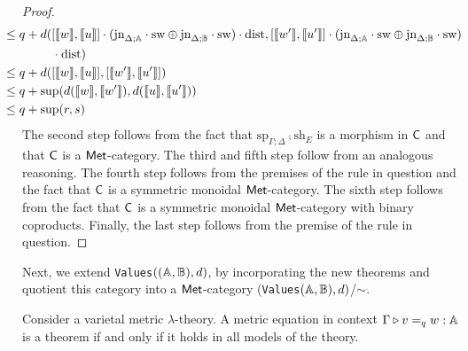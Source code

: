\begin{proof}
\begin{align*}
    & \hspace{-20pt} \leq  q +  d( [\llbracket w\rrbracket ,\llbracket u\rrbracket] \comp (\text{jn}_{\Delta;\typeA}\comp \sw \oplus \text{jn}_{\Delta;\typeB}\comp \sw) \comp \dist,  [\llbracket w'\rrbracket ,\llbracket u'\rrbracket] \comp (\text{jn}_{\Delta;\typeA}\comp \sw \oplus \text{jn}_{\Delta;\typeB}\comp \sw)  \\
    & \hspace{20pt} \comp \dist)\\
    &  \hspace{-20pt} \leq q +  d( [\llbracket w\rrbracket ,\llbracket u\rrbracket],  [\llbracket w'\rrbracket ,\llbracket u'\rrbracket]) \\
    & \hspace{-20pt}  \leq q + \sup(d( \llbracket w\rrbracket , \llbracket w' \rrbracket), d( \llbracket u\rrbracket , \llbracket u' \rrbracket)) \\
    & \hspace{-20pt} \leq  q + \sup(r, s) \\
  \end{align*}
  The second step follows from the fact that $\text{sp}_{\Gamma;\Delta} \comp \text{sh}_{E}$  is a morphism in $\mathsf{C}$  and that $\mathsf{C}$ is a $\mathsf{Met}$-category.  The third and fifth step follow from an analogous reasoning. The fourth step follows from the premises of the rule in question and the fact that $\mathsf{C}$ is a symmetric monoidal $\mathsf{Met}$-category. The sixth step follows from the fact that $\mathsf{C}$ is a symmetric monoidal $\mathsf{Met}$-category with binary coproducts. Finally, the last step follows from the premise of the rule in question.

\end{proof}

Next, we extend  \texttt{Values}$((\mathbb{A},\mathbb{B}),d)$, by incorporating the new theorems and quotient this category into a  $\mathsf{Met}$-category (\texttt{Values}$(\mathbb{A},\mathbb{B}),d)$/$\sim$.


\begin{theorem}[Completeness]
Consider a varietal metric $\lambda$-theory. A metric equation in context
$\Gamma \triangleright v =_{q} w : \mathbb{A}$
is a theorem if and only if it holds in all models of the theory.
\end{theorem}

